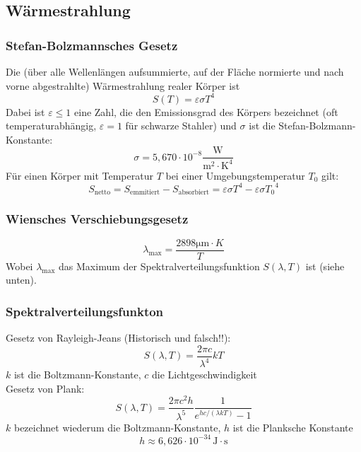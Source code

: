 \subsection{Wärmestrahlung}
\subsubsection{Stefan-Bolzmannsches Gesetz}
Die (über alle Wellenlängen aufsummierte, auf der Fläche normierte und nach vorne abgestrahlte) Wärmestrahlung realer Körper ist
\begin{equation}
S \left( T \right) = \varepsilon \sigma T^4
\end{equation}
Dabei ist $\varepsilon \leq 1$ eine Zahl, die den Emissionsgrad des Körpers bezeichnet (oft temperaturabhängig, $\varepsilon = 1$ für schwarze Stahler) und $\sigma$ ist die Stefan-Bolzmann-Konstante:
\begin{equation}
\sigma = 5,670 \cdot 10^{-8} \frac{\mathrm{W}}{\mathrm{m^2 \cdot K^4}}
\end{equation}
Für einen Körper mit Temperatur $T$ bei einer Umgebungstemperatur $T_0$ gilt:
\begin{equation}
S_\mathrm{netto} = S_\mathrm{emmitiert} - S_\mathrm{absorbiert} = \varepsilon \sigma T^4 - \varepsilon \sigma {T_0}^4
\end{equation}
\subsubsection{Wiensches Verschiebungsgesetz}
\begin{equation}
\lambda_\mathrm{max} = \frac{2898 \mathrm{\mu m} \cdot K}{T}
\end{equation}
Wobei $\lambda_\mathrm{max}$ das Maximum der Spektralverteilungsfunktion $S \left( \lambda, T \right)$ ist (siehe unten).
\subsubsection{Spektralverteilungsfunkton}
Gesetz von Rayleigh-Jeans (Historisch und falsch!!):
\begin{equation}
S \left( \lambda, T \right) = \frac{2 \pi c}{\lambda^4}kT
\end{equation}
$k$ ist die Boltzmann-Konstante, $c$ die Lichtgeschwindigkeit \\[1em]
Gesetz von Plank:
\begin{equation}
S \left( \lambda, T \right) = \frac{2 \pi c^2 h}{\lambda^5} \frac{1}{e^{hc/\left(\lambda k T \right)} - 1}
\end{equation}
$k$ bezeichnet wiederum die Boltzmann-Konstante, $h$ ist die Planksche Konstante
\begin{equation}
h \approx 6,626 \cdot 10^{-34} \,\mathrm{J \cdot s}
\end{equation}
